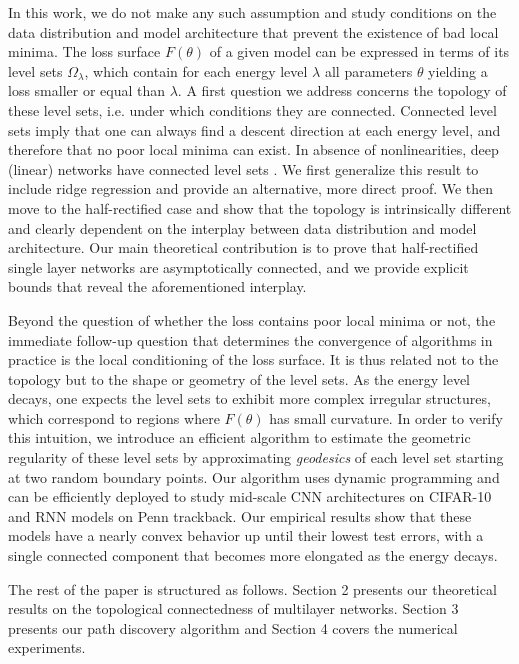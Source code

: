 In this work, we do not make any such assumption and study conditions 
on the data distribution and model architecture that prevent the existence 
of bad local minima. 
The loss surface $F(\theta)$ of a given model can be expressed in terms of its level sets $\Omega_\lambda$, which contain for each energy level $\lambda$ all parameters $\theta$ yielding a loss smaller or equal than $\lambda$. A first question we address concerns the topology of these level sets, i.e. under which conditions they are connected. Connected level sets imply that one can always find a descent direction at each energy level, and therefore that no poor local minima can exist. In absence of nonlinearities, deep (linear) networks have connected level sets \cite{kawaguchi2016deep}. We first generalize this result to include ridge regression and provide an alternative, more direct proof. We then move to the half-rectified case and show that the topology is intrinsically different and clearly dependent on the interplay between data distribution and model architecture. Our main theoretical contribution is to prove that half-rectified single layer networks are asymptotically connected, and we provide explicit bounds that reveal the aforementioned interplay.

Beyond the question of whether the loss contains poor local minima or not, the immediate follow-up question that determines the convergence of algorithms in practice is the local conditioning of the loss surface. It is thus related not to the topology but to the shape or geometry of the level sets. As the energy level decays, one expects the level sets to exhibit more complex irregular structures, which correspond to regions where $F(\theta)$ has small curvature. In order to verify this intuition, we introduce an efficient algorithm to estimate the geometric regularity of these level sets by approximating \emph{geodesics} of each level set starting at two random boundary points. Our algorithm uses dynamic programming and can be efficiently deployed to study mid-scale CNN architectures on CIFAR-10 and RNN models on Penn trackback. 
Our empirical results show that these models have a nearly convex behavior up until their lowest test errors, with a single connected component that becomes more elongated as the energy decays. 

The rest of the paper is structured as follows. Section 2 presents our theoretical results on the topological connectedness of multilayer networks. Section 3 presents our path discovery algorithm and Section 4 covers the numerical experiments. 













